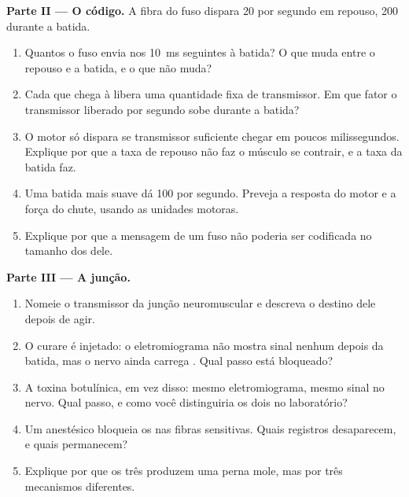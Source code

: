 \begin{problem}
\medskip
\noindent\textbf{Parte II --- O código.}
A fibra do fuso dispara 20  por segundo em repouso,
200 durante a batida.
\begin{enumerate}[resume]
  \item Quantos  o fuso envia nos \qty{10}{ms}
        seguintes à batida? O que muda entre o repouso e a batida, e o
        que não muda?
  \item Cada  que chega à  libera uma
        quantidade fixa de transmissor. Em que fator o transmissor
        liberado por segundo sobe durante a batida?
  \item O  motor só dispara se transmissor suficiente chegar em
        poucos milissegundos. Explique por que a taxa de repouso não
        faz o músculo se contrair, e a taxa da batida faz.
  \item Uma batida mais suave dá 100 por segundo. Preveja a resposta do
         motor e a força do chute, usando as unidades motoras.
  \item Explique por que a mensagem de um fuso não poderia ser
        codificada no tamanho dos  dele.
\end{enumerate}

\medskip
\noindent\textbf{Parte III --- A junção.}
\begin{enumerate}[resume]
  \item Nomeie o transmissor da junção neuromuscular e descreva o
        destino dele depois de agir.
  \item O curare é injetado: o eletromiograma não mostra sinal nenhum
        depois da batida, mas o nervo ainda carrega .
        Qual passo está bloqueado?
  \item A toxina botulínica, em vez disso: mesmo eletromiograma, mesmo
        sinal no nervo. Qual passo, e como você distinguiria os dois no
        laboratório?
  \item Um anestésico bloqueia os  nas fibras
        sensitivas. Quais registros desaparecem, e quais permanecem?
  \item Explique por que os três produzem uma perna mole, mas por três
        mecanismos diferentes.
\end{enumerate}


\end{problem}
